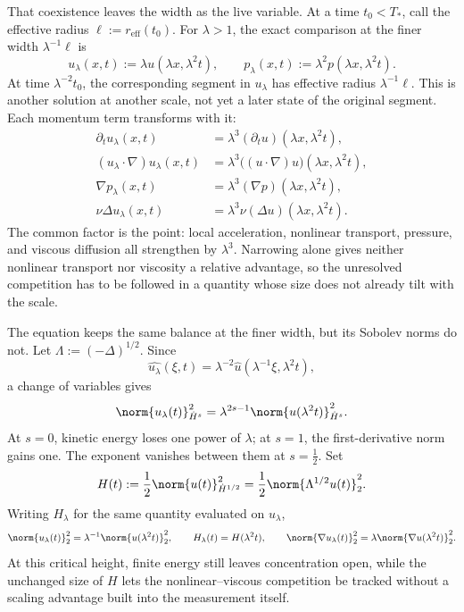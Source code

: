 
That coexistence leaves the width as the live variable. At a time \(t_0<T_*\), call the effective radius \(\ell:=r_{\mathrm{eff}}(t_0)\). For \(\lambda>1\), the exact \NavierStokes{} comparison at the finer width \(\lambda^{-1}\ell\) is
\[
  u_\lambda(x,t)
  :=
  \lambda u(\lambda x,\lambda^2t),
  \qquad
  p_\lambda(x,t)
  :=
  \lambda^2p(\lambda x,\lambda^2t).
\]
At time \(\lambda^{-2}t_0\), the corresponding segment in \(u_\lambda\) has effective radius \(\lambda^{-1}\ell\). This is another solution at another scale, not yet a later state of the original segment. Each momentum term transforms with it:
\[
\begin{aligned}
  \partial_tu_\lambda(x,t)
  &=
  \lambda^3(\partial_tu)(\lambda x,\lambda^2t),
  \\
  (u_\lambda\cdot\nabla)u_\lambda(x,t)
  &=
  \lambda^3\bigl((u\cdot\nabla)u\bigr)(\lambda x,\lambda^2t),
  \\
  \nabla p_\lambda(x,t)
  &=
  \lambda^3(\nabla p)(\lambda x,\lambda^2t),
  \\
  \nu\Delta u_\lambda(x,t)
  &=
  \lambda^3\nu(\Delta u)(\lambda x,\lambda^2t).
\end{aligned}
\]
The common factor is the point: local acceleration, nonlinear transport, pressure, and viscous diffusion all strengthen by \(\lambda^3\). Narrowing alone gives neither nonlinear transport nor viscosity a relative advantage, so the unresolved competition has to be followed in a quantity whose size does not already tilt with the scale.


The equation keeps the same balance at the finer width, but its Sobolev norms do not. Let \(\Lambda:=(-\Delta)^{1/2}\). Since
\[
  \widehat{u_\lambda}(\xi,t)
  =
  \lambda^{-2}\widehat u(\lambda^{-1}\xi,\lambda^2t),
\]
a change of variables gives
\[
  \norm{u_\lambda(t)}_{\dot H^s}^2
  =
  \lambda^{2s-1}
  \norm{u(\lambda^2t)}_{\dot H^s}^2.
\]
At \(s=0\), kinetic energy loses one power of \(\lambda\); at \(s=1\), the first-derivative norm gains one. The exponent vanishes between them at \(s=\tfrac12\). Set
\[
  H(t)
  :=
  \frac12\norm{u(t)}_{\dot H^{1/2}}^2
  =
  \frac12\norm{\Lambda^{1/2}u(t)}_2^2.
\]
Writing \(H_\lambda\) for the same quantity evaluated on \(u_\lambda\),
\[
  \norm{u_\lambda(t)}_2^2
  =
  \lambda^{-1}\norm{u(\lambda^2t)}_2^2,
  \qquad
  H_\lambda(t)=H(\lambda^2t),
  \qquad
  \norm{\nabla u_\lambda(t)}_2^2
  =
  \lambda\norm{\nabla u(\lambda^2t)}_2^2.
\]
At this critical height, finite energy still leaves concentration open, while the unchanged size of \(H\) lets the nonlinear--viscous competition be tracked without a scaling advantage built into the measurement itself.


